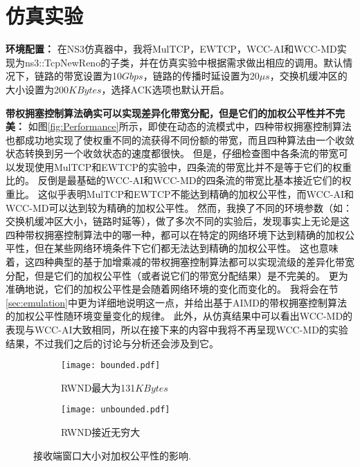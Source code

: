 \documentclass[winfonts]{njuthesis}
\begin{document}
\section{仿真实验}
\label{sec:simulation}

\textbf{环境配置：}
在NS3仿真器中，我将MulTCP，EWTCP，WCC-AI和WCC-MD实现为ns3::TcpNewReno的子类，并在仿真实验中根据需求做出相应的调用。默认情况下，链路的带宽设置为10$Gbps$，链路的传播时延设置为20$\mu s$，交换机缓冲区的大小设置为200$KBytes$，选择ACK选项也默认开启。

\textbf{带权拥塞控制算法确实可以实现差异化带宽分配，但是它们的加权公平性并不完美：}
如图\ref{fig:Performance}所示，即使在动态的流模式中，四种带权拥塞控制算法也都成功地实现了使权重不同的流获得不同份额的带宽，而且四种算法由一个收敛状态转换到另一个收敛状态的速度都很快。
但是，仔细检查图中各条流的带宽可以发现使用MulTCP和EWTCP的实验中，四条流的带宽比并不是等于它们的权重比的。
反倒是最基础的WCC-AI和WCC-MD的四条流的带宽比基本接近它们的权重比。
这似乎表明MulTCP和EWTCP不能达到精确的加权公平性，而WCC-AI和WCC-MD可以达到较为精确的加权公平性。
然而，我换了不同的环境参数（如：交换机缓冲区大小，链路时延等），做了多次不同的实验后，发现事实上无论是这四种带权拥塞控制算法中的哪一种，都可以在特定的网络环境下达到精确的加权公平性，但在某些网络环境条件下它们都无法达到精确的加权公平性。
这也意味着，这四种典型的基于加增乘减的带权拥塞控制算法都可以实现流级的差异化带宽分配，但是它们的加权公平性（或者说它们的带宽分配结果）是不完美的。
更为准确地说，它们的加权公平性是会随着网络环境的变化而变化的。
我将会在节\ref{sec:emulation}中更为详细地说明这一点，并给出基于AIMD的带权拥塞控制算法的加权公平性随环境变量变化的规律。
此外，从仿真结果中可以看出WCC-MD的表现与WCC-AI大致相同，所以在接下来的内容中我将不再呈现WCC-MD的实验结果，不过我们之后的讨论与分析还会涉及到它。

\begin{figure}[ht]
	\begin{subfigure}{.5\textwidth}
    \centering
    \texttt{[image: bounded.pdf]}
    \caption{RWND最大为131$KBytes$}
	\label{fig:BoundedCwnd}
  \end{subfigure}
	\begin{subfigure}{.5\textwidth}
		\centering
    \texttt{[image: unbounded.pdf]}
    \caption{RWND接近无穷大}
	\label{fig:UnbounedCwnd}
  \end{subfigure}
	\caption{接收端窗口大小对加权公平性的影响.}
	\label{fig:EndHostBuffer}
\end{figure}
\end{document}
